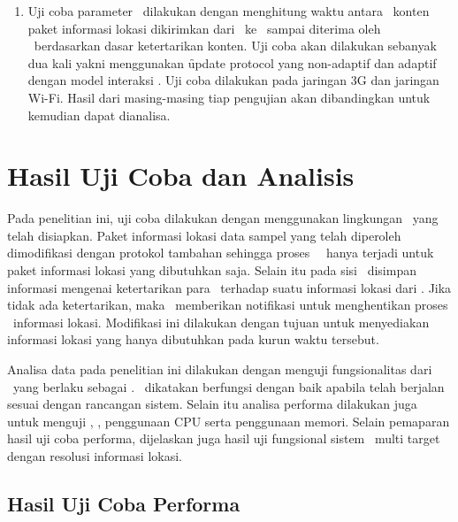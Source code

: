 \begin{enumerate}
  \item \Latency

	Uji coba parameter \latency~dilakukan dengan menghitung waktu antara
	\publish~konten paket informasi lokasi dikirimkan dari \publisher~ke
	\server~sampai diterima oleh \subscriber~berdasarkan dasar ketertarikan
	konten. Uji coba akan dilakukan sebanyak dua kali yakni menggunakan \f{update
		protocol} yang non-adaptif dan adaptif dengan model interaksi \pubsub. Uji
  coba dilakukan pada jaringan 3G dan jaringan Wi-Fi. Hasil
	dari masing-masing tiap pengujian akan dibandingkan untuk kemudian dapat
	dianalisa.

\end{enumerate}



\section{Hasil Uji Coba dan Analisis}

Pada penelitian ini, uji coba dilakukan dengan menggunakan lingkungan
\testbed~yang telah disiapkan. Paket informasi lokasi data sampel yang telah
diperoleh dimodifikasi dengan protokol tambahan sehingga proses
\event~\publish~hanya terjadi untuk paket informasi lokasi yang dibutuhkan saja.
Selain itu pada sisi \broker~disimpan informasi mengenai ketertarikan para
\subscriber~terhadap suatu informasi lokasi dari \publisher. Jika tidak ada
ketertarikan, maka \broker~memberikan notifikasi untuk menghentikan proses
\publish~informasi lokasi. Modifikasi ini dilakukan dengan tujuan untuk
menyediakan informasi lokasi yang hanya dibutuhkan pada kurun waktu tersebut.

Analisa data pada penelitian ini dilakukan dengan menguji fungsionalitas dari
\subscriber~yang berlaku sebagai \tracker. \Subscriber~dikatakan berfungsi
dengan baik apabila telah berjalan sesuai dengan rancangan sistem. Selain itu
analisa performa dilakukan juga untuk menguji \bandwidth, \latency, penggunaan
CPU serta penggunaan memori. Selain pemaparan hasil uji coba performa,
dijelaskan juga hasil uji fungsional sistem \tracking~multi target dengan
resolusi informasi lokasi.

\subsection{Hasil Uji Coba Performa}

